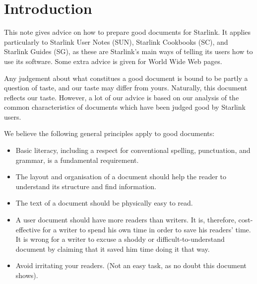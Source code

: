 \stardocabstract
 \newpage
 \begin{latexonly}
   \setlength{\parskip}{0mm}
   \latexonlytoc
   \setlength{\parskip}{\medskipamount}
   \markright{\stardocname}
 \end{latexonly}
\newpage
\renewcommand{\thepage}{\arabic{page}}
\setcounter{page}{1}

\section{Introduction}

This note gives advice on how to prepare good documents for Starlink.
It applies particularly to Starlink User Notes (SUN), Starlink Cookbooks (SC),
and Starlink Guides (SG), as these are Starlink's main ways of telling its users
how to use its software.
Some extra advice is given for World Wide Web pages.

Any judgement about what constitues a good document is bound to be partly a
question of taste, and our taste may differ from yours.
Naturally, this document reflects our taste.
However, a lot of our advice is based on our analysis of the common
characteristics of documents which have been judged good by Starlink users.

We believe the following general principles apply to good documents:

\begin{itemize}
\item Basic literacy, including a respect for conventional spelling,
punctuation, and grammar, is a fundamental requirement.
\item The layout and organisation of a document should help the reader to
understand its structure and find information.
\item The text of a document should be physically easy to read.
\item A user document should have more readers than writers.
It is, therefore, cost-effective for a writer to spend his own time in order
to save his readers' time.
It is wrong for a writer to excuse a shoddy or difficult-to-understand document
by claiming that it saved him time doing it that way.
\item Avoid irritating your readers.
(Not an easy task, as no doubt this document shows).
\end{itemize}

